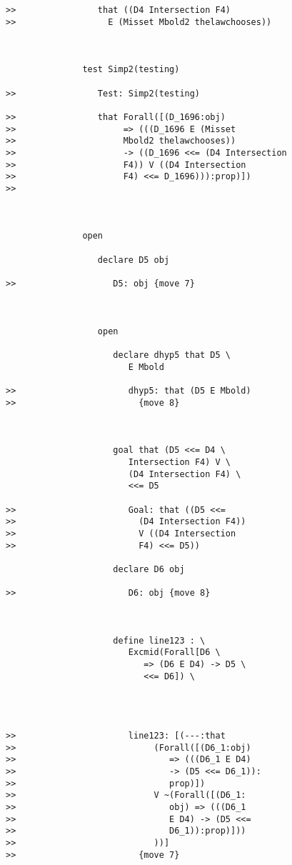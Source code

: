 \documentclass[12pt]{article}
\begin{document}
\begin{verbatim}
>>                that ((D4 Intersection F4)
>>                  E (Misset Mbold2 thelawchooses))



               test Simp2(testing)

>>                Test: Simp2(testing)

>>                that Forall([(D_1696:obj)
>>                     => (((D_1696 E (Misset
>>                     Mbold2 thelawchooses))
>>                     -> ((D_1696 <<= (D4 Intersection
>>                     F4)) V ((D4 Intersection
>>                     F4) <<= D_1696))):prop)])
>>                  



               open

                  declare D5 obj

>>                   D5: obj {move 7}



                  open

                     declare dhyp5 that D5 \
                        E Mbold

>>                      dhyp5: that (D5 E Mbold)
>>                        {move 8}



                     goal that (D5 <<= D4 \
                        Intersection F4) V \
                        (D4 Intersection F4) \
                        <<= D5

>>                      Goal: that ((D5 <<=
>>                        (D4 Intersection F4))
>>                        V ((D4 Intersection
>>                        F4) <<= D5))

                     declare D6 obj

>>                      D6: obj {move 8}



                     define line123 : \
                        Excmid(Forall[D6 \
                           => (D6 E D4) -> D5 \
                           <<= D6]) \
                        



>>                      line123: [(---:that
>>                           (Forall([(D6_1:obj)
>>                              => (((D6_1 E D4)
>>                              -> (D5 <<= D6_1)):
>>                              prop)])
>>                           V ~(Forall([(D6_1:
>>                              obj) => (((D6_1
>>                              E D4) -> (D5 <<=
>>                              D6_1)):prop)]))
>>                           ))]
>>                        {move 7}




\end{verbatim}
\end{document}
